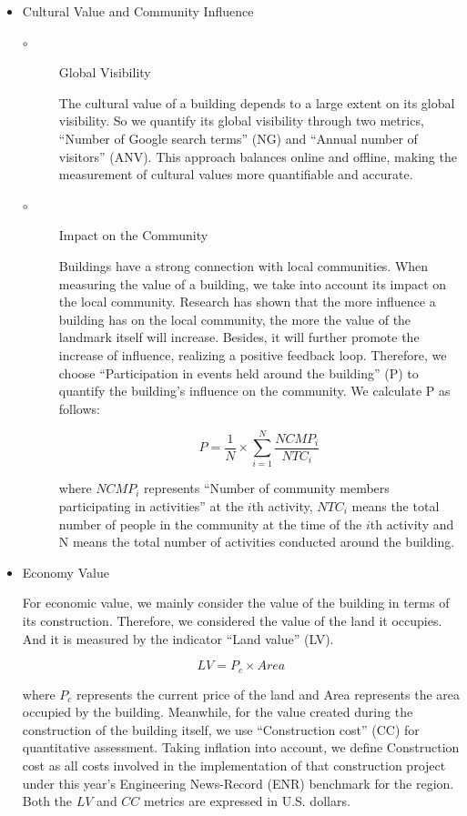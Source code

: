 \documentclass{mcmthesis}
\begin{document}
\begin{itemize}
\item Cultural Value and Community Influence
\begin{description}
\item [$\circ$] Global Visibility

The cultural value of a building depends to a large extent on its global visibility. So we
quantify its global visibility through two metrics, ``Number of Google search terms''
(NG) and ``Annual number of visitors'' (ANV). This approach balances online and offline,
making the measurement of cultural values more quantifiable and accurate.

\item [$\circ$] Impact on the Community

Buildings have a strong connection with local communities. When measuring the value
of a building, we take into account its impact on the local community. Research has
shown that the more influence a building has on the local community, the more the
value of the landmark itself will increase. Besides, it will further promote the increase
of influence, realizing a positive feedback loop. Therefore, we choose ``Participation in
events held around the building'' (P) to quantify the building's influence on the community.
We calculate P as follows:

\begin{equation}
P = \frac{1}{N} \times \sum_{i = 1}^N \frac{NCMP_i}{NTC_i}
\end{equation}

where $NCMP_i$ represents ``Number of community members participating in activities''
at the $i$th activity, $NTC_i$ means the total number of people in the community at the
time of the $i$th activity and N means the total number of activities conducted around
the building.

\end{description}

\item Economy Value

For economic value, we mainly consider the value of the building in terms of its construction.
Therefore, we considered the value of the land it occupies. And it is measured
by the indicator ``Land value'' (LV).

\begin{equation}
LV = P_c \times Area
\end{equation}

where $P_c$ represents the current price of the land and Area represents the area occupied by
the building. Meanwhile, for the value created during the construction of the building itself,
we use ``Construction cost'' (CC) for quantitative assessment. Taking inflation into account,
we define Construction cost as all costs involved in the implementation of that construction
project under this year's Engineering News-Record (ENR) benchmark for the region. Both
the $LV$ and $CC$ metrics are expressed in U.S. dollars.


\end{itemize}
\end{document}
